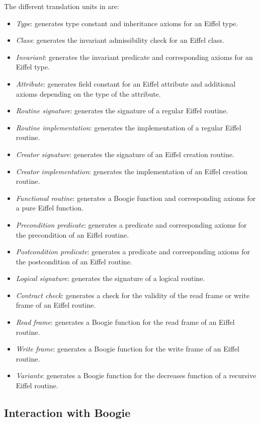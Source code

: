 The different translation units in \AutoProof are:
\begin{itemize}
\item \emph{Type}: generates type constant and inheritance axioms for an Eiffel type.
\item \emph{Class}: generates the invariant admissibility check for an Eiffel class.
\item \emph{Invariant}: generates the invariant predicate and corresponding axioms for an Eiffel type.
\item \emph{Attribute}: generates field constant for an Eiffel attribute and additional axioms depending on the type of the attribute.
\item \emph{Routine signature}: generates the signature of a regular Eiffel routine.
\item \emph{Routine implementation}: generates the implementation of a regular Eiffel routine.
\item \emph{Creator signature}: generates the signature of an Eiffel creation routine.
\item \emph{Creator implementation}: generates the implementation of an Eiffel creation routine.
\item \emph{Functional routine}: generates a Boogie function and corresponding axioms for a pure Eiffel function.
\item \emph{Precondition predicate}: generates a predicate and corresponding axioms for the precondition of an Eiffel routine.
\item \emph{Postcondition predicate}: generates a predicate and corresponding axioms for the postcondition of an Eiffel routine.
\item \emph{Logical signature}: generates the signature of a logical routine.
\item \emph{Contract check}: generates a check for the validity of the read frame or write frame of an Eiffel routine.
\item \emph{Read frame}: generates a Boogie function for the read frame of an Eiffel routine.
\item \emph{Write frame}: generates a Boogie function for the write frame of an Eiffel routine.
\item \emph{Variants}: generates a Boogie function for the decreases function of a recursive Eiffel routine.
\end{itemize}


\subsection{Interaction with Boogie}

